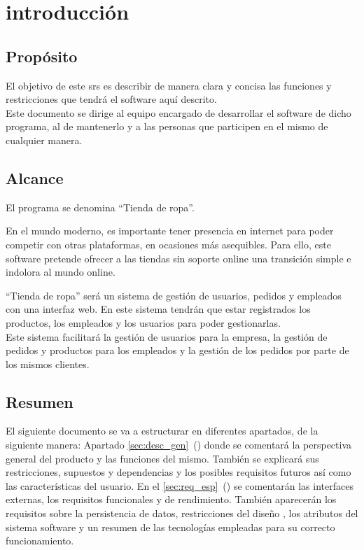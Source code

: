 \section{introducción}
\subsection{Propósito}
El objetivo de este \gls{srs} es describir de manera clara y concisa las funciones y restricciones que tendrá el software aquí descrito.\\
Este documento se dirige al equipo encargado de desarrollar el software de dicho programa, al de mantenerlo y a las personas que participen en el mismo de cualquier manera.
\subsection{Alcance}
El programa se denomina ``Tienda de ropa''.

En el mundo moderno, es importante tener presencia en internet para poder competir con otras plataformas, en ocasiones más asequibles. Para ello, este software pretende ofrecer a las tiendas sin soporte online una transición simple e indolora al mundo online.

``Tienda de ropa'' será un sistema de gestión de usuarios, pedidos y empleados con una interfaz web. En este sistema tendrán que estar registrados los productos, los empleados y los usuarios para poder gestionarlas.\\
Este sistema facilitará la gestión de usuarios para la empresa, la gestión de pedidos y productos para los empleados y la gestión de los pedidos por parte de los mismos clientes.


\glsaddall
\nocite{*}
{
    \printglossary[title=Definiciones\, acrónimos y abreviaturas, numberedsection]}



\subsection{Resumen}
El siguiente documento se va a estructurar en diferentes apartados, de la siguiente manera: Apartado \ref{sec:desc_gen}~() donde se comentará la perspectiva general del producto y las funciones del mismo. También se explicará sus restricciones, supuestos y dependencias y los posibles requisitos futuros así como las características del usuario.
En el \ref{sec:req_esp}~() se comentarán las interfaces externas, los requisitos funcionales y de rendimiento. También aparecerán los requisitos sobre la persistencia de datos, restricciones del diseño , los atributos del sistema software y un resumen de las tecnologías empleadas para su correcto funcionamiento.
